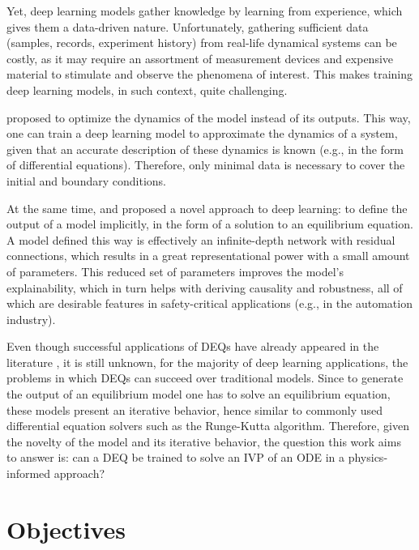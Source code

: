 Yet, deep learning models gather knowledge by learning from experience, which gives them a data-driven nature.
Unfortunately, gathering sufficient data (samples, records, experiment history) from real-life dynamical systems can be costly, as it may require an assortment of measurement devices and expensive material to stimulate and observe the phenomena of interest.
This makes training deep learning models, in such context, quite challenging.

\textcite{Raissi2019} proposed to optimize the dynamics of the model instead of its outputs.
This way, one can train a deep learning model to approximate the dynamics of a system, given that an accurate description of these dynamics is known (e.g., in the form of differential equations).
Therefore, only minimal data is necessary to cover the initial and boundary conditions.

At the same time, \textcite{Bai2019} and \textcite{Ghaoui2019} proposed a novel approach to deep learning: to define the output of a model implicitly, in the form of a solution to an equilibrium equation.
A model defined this way is effectively an infinite-depth network \cite{Bai2019} with residual connections\cite{he_deep_2016}, which results in a great representational power with a small amount of parameters.
This reduced set of parameters improves the model's explainability, which in turn helps with deriving causality and robustness, all of which are desirable features in safety-critical applications (e.g., in the automation industry).

Even though successful applications of \gls{DEQ}s have already appeared in the literature \cite{bai_multiscale_2020}, it is still unknown, for the majority of deep learning applications, the problems in which \gls{DEQ}s can succeed over traditional models.
Since to generate the output of an equilibrium model one has to solve an equilibrium equation, these models present an iterative behavior, hence similar to commonly used differential equation solvers such as the Runge-Kutta algorithm.
Therefore, given the novelty of the model and its iterative behavior, the question this work aims to answer is: can a \gls{DEQ} be trained to solve an \gls{IVP} of an \gls{ODE} in a physics-informed approach?

\section{Objectives}

